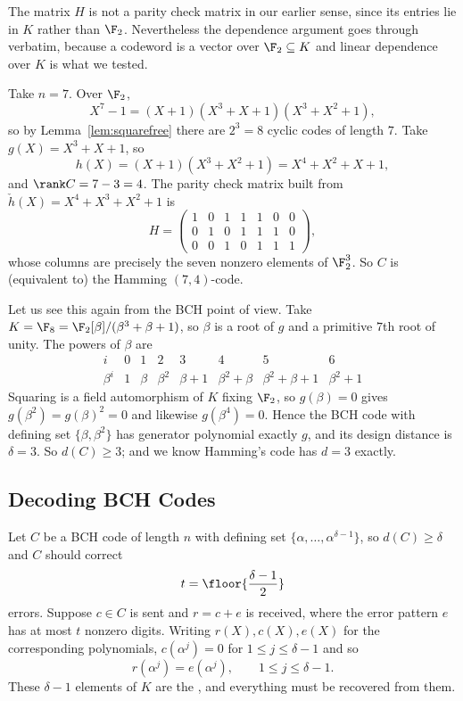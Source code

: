 \begin{remark}
	The matrix $H$ is not a parity check matrix in our earlier sense, since its entries lie in $K$ rather than $\F_2$. Nevertheless the dependence argument goes through verbatim, because a codeword is a vector over $\F_2 \subseteq K$ and linear dependence over $K$ is what we tested.
\end{remark}

\begin{example}\label{ex:bch7}
	Take $n = 7$. Over $\F_2$,
	$$X^7-1 = (X+1)(X^3+X+1)(X^3+X^2+1),$$
	so by Lemma~\ref{lem:squarefree} there are $2^3 = 8$ cyclic codes of length $7$. Take $g(X) = X^3+X+1$, so
	$$h(X) = (X+1)(X^3+X^2+1) = X^4+X^2+X+1,$$
	and $\rank C = 7 - 3 = 4$. The parity check matrix built from $\check h(X) = X^4 + X^3 + X^2 + 1$ is
	$$H = \begin{pmatrix} 1&0&1&1&1&0&0\\0&1&0&1&1&1&0\\0&0&1&0&1&1&1\end{pmatrix},$$
	whose columns are precisely the seven nonzero elements of $\F_2^3$. So $C$ is (equivalent to) the Hamming $(7,4)$-code.

	Let us see this again from the BCH point of view. Take $K = \F_8 = \F_2[\beta]/(\beta^3+\beta+1)$, so $\beta$ is a root of $g$ and a primitive $7$th root of unity. The powers of $\beta$ are
	$$\begin{array}{c|ccccccc}
		i & 0&1&2&3&4&5&6\\\hline
		\beta^i & 1 & \beta & \beta^2 & \beta+1 & \beta^2+\beta & \beta^2+\beta+1 & \beta^2+1
	\end{array}$$
	Squaring is a field automorphism of $K$ fixing $\F_2$, so $g(\beta) = 0$ gives $g(\beta^2) = g(\beta)^2 = 0$ and likewise $g(\beta^4)=0$. Hence the BCH code with defining set $\{\beta,\beta^2\}$ has generator polynomial exactly $g$, and its design distance is $\delta = 3$. So $d(C)\ge3$; and we know Hamming's code has $d = 3$ exactly.
\end{example}

\subsection{Decoding BCH Codes}

Let $C$ be a BCH code of length $n$ with defining set $\{\alpha,\dots,\alpha^{\delta-1}\}$, so $d(C)\ge\delta$ and $C$ should correct
$$t = \floor{\frac{\delta-1}{2}}$$
errors. Suppose $c \in C$ is sent and $r = c+e$ is received, where the error pattern $e$ has at most $t$ nonzero digits. Writing $r(X), c(X), e(X)$ for the corresponding polynomials, $c(\alpha^j)=0$ for $1\le j\le\delta-1$ and so
$$r(\alpha^j) = e(\alpha^j), \qquad 1 \le j \le \delta-1.$$
These $\delta-1$ elements of $K$ are the , and everything must be recovered from them.

